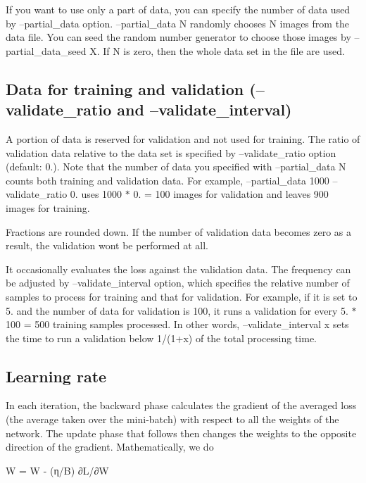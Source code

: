 If you want to use only a part of data, you can specify the number of data used by --partial\+\_\+data option. --partial\+\_\+data N randomly chooses N images from the data file. You can seed the random number generator to choose those images by --partial\+\_\+data\+\_\+seed X. If N is zero, then the whole data set in the file are used.

\subsection*{Data for training and validation (--validate\+\_\+ratio and --validate\+\_\+interval) }

A portion of data is reserved for validation and not used for training. The ratio of validation data relative to the data set is specified by --validate\+\_\+ratio option (default\+: 0.). Note that the number of data you specified with --partial\+\_\+data N counts both training and validation data. For example, --partial\+\_\+data 1000 --validate\+\_\+ratio 0. uses 1000 $\ast$ 0. = 100 images for validation and leaves 900 images for training.

Fractions are rounded down. If the number of validation data becomes zero as a result, the validation won\textquotesingle{}t be performed at all.

It occasionally evaluates the loss against the validation data. The frequency can be adjusted by --validate\+\_\+interval option, which specifies the relative number of samples to process for training and that for validation. For example, if it is set to 5. and the number of data for validation is 100, it runs a validation for every 5. $\ast$ 100 = 500 training samples processed. In other words, --validate\+\_\+interval x sets the time to run a validation below 1/(1+x) of the total processing time.

\subsection*{Learning rate }

In each iteration, the backward phase calculates the gradient of the averaged loss (the average taken over the mini-\/batch) with respect to all the weights of the network. The update phase that follows then changes the weights to the opposite direction of the gradient. Mathematically, we do \begin{DoxyVerb}W = W - (η/B) ∂L/∂W
\end{DoxyVerb}


